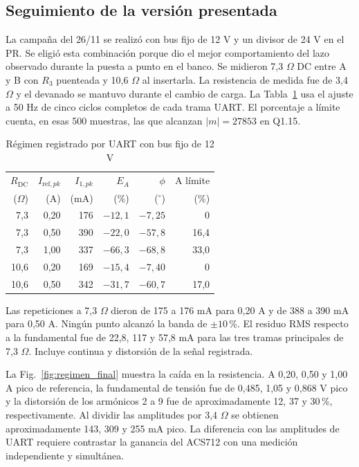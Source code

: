 \documentclass[conference]{IEEEtran}
\begin{document}
\subsection{Seguimiento de la versión presentada}
La campaña del 26/11 se realizó con bus fijo de 12 V y un divisor de 24 V en el PR. Se eligió esta combinación porque dio el mejor comportamiento del lazo observado durante la puesta a punto en el banco. Se midieron 7,3 $\Omega$ DC entre A y B con $R_3$ puenteada y 10,6 $\Omega$ al insertarla. La resistencia de medida fue de 3,4 $\Omega$ y el devanado se mantuvo durante el cambio de carga. La Tabla~\ref{tab:final} usa el ajuste a 50 Hz de cinco ciclos completos de cada trama UART. El porcentaje a límite cuenta, en esas 500 muestras, las que alcanzan $|m|=27853$ en Q1.15.

\begin{table}[H]\centering\small
\caption{Régimen registrado por UART con bus fijo de 12 V}
\label{tab:final}
\begin{tabular}{@{}rrrrrr@{}}\toprule
$R_{\mathrm{DC}}$ & $I_{\mathrm{ref},pk}$ & $I_{1,pk}$ & $E_A$ & $\phi$ & A límite\\
($\Omega$) & (A) & (mA) & (\%) & ($^\circ$) & (\%)\\\midrule
7,3 & 0,20 & 176 & $-12{,}1$ & $-7{,}25$ & 0\\
7,3 & 0,50 & 390 & $-22{,}0$ & $-57{,}8$ & 16,4\\
7,3 & 1,00 & 337 & $-66{,}3$ & $-68{,}8$ & 33,0\\
10,6 & 0,20 & 169 & $-15{,}4$ & $-7{,}40$ & 0\\
10,6 & 0,50 & 342 & $-31{,}7$ & $-60{,}7$ & 17,0\\\bottomrule
\end{tabular}
\end{table}
Las repeticiones a 7,3 $\Omega$ dieron de 175 a 176 mA para 0,20 A y de 388 a 390 mA para 0,50 A. Ningún punto alcanzó la banda de $\pm10$\,\%. El residuo RMS respecto a la fundamental fue de 22,8, 117 y 57,8 mA para las tres tramas principales de 7,3 $\Omega$. Incluye continua y distorsión de la señal registrada.

La Fig.~\ref{fig:regimen_final} muestra la caída en la resistencia. A 0,20, 0,50 y 1,00 A pico de referencia, la fundamental de tensión fue de 0,485, 1,05 y 0,868 V pico y la distorsión de los armónicos 2 a 9 fue de aproximadamente 12, 37 y 30\,\%, respectivamente. Al dividir las amplitudes por 3,4 $\Omega$ se obtienen aproximadamente 143, 309 y 255 mA pico. La diferencia con las amplitudes de UART requiere contrastar la ganancia del ACS712 con una medición independiente y simultánea.
\end{document}
